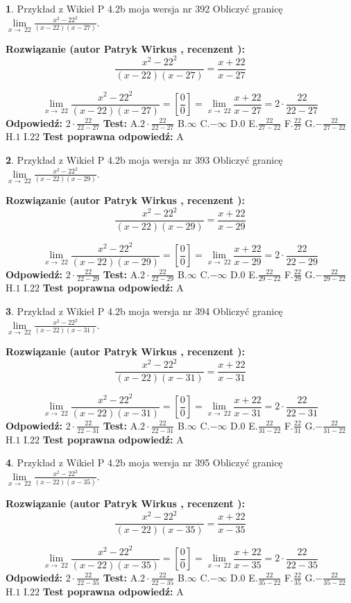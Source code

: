\documentclass[12pt, a4paper]{article}
\theoremstyle{definition} %
\newtheorem{zad}{}
\newcommand{\zadStart}[1]{\begin{zad}#1\newline}
\newcommand{\zadStop}{\end{zad}}
\newcommand{\rozwStart}[2]{\noindent \textbf{Rozwiązanie (autor #1 , recenzent #2): }\newline}
\newcommand{\rozwStop}{\newline}
\newcommand{\odpStart}{\noindent \textbf{Odpowiedź:}\newline}
\newcommand{\odpStop}{\newline}
\newcommand{\testStart}{\noindent \textbf{Test:}\newline}
\newcommand{\testStop}{\newline}
\newcommand{\kluczStart}{\noindent \textbf{Test poprawna odpowiedź:}\newline}
\newcommand{\kluczStop}{\newline}
\begin{document}
\zadStart{Przykład z Wikieł P 4.2b moja wersja nr 392}
Obliczyć granicę $\lim\limits_{x\to\ 22}\frac{x^{2}-22^{2}}{(x-22)(x-27)}$.
\zadStop
\rozwStart{Patryk Wirkus}{}
$$\frac{x^{2}-22^{2}}{(x-22)(x-27)}=\frac{x+22}{x-27}$$

$$\lim\limits_{x\to\ 22}\frac{x^{2}-22^{2}}{(x-22)(x-27)}=[\frac{0}{0}]=\lim\limits_{x\to\ 22}\frac{x+22}{x-27}=2 \cdot \frac{22}{22-27}$$
\rozwStop
\odpStart
$2 \cdot \frac{22}{22-27}$
\odpStop
\testStart
A.$2 \cdot \frac{22}{22-27}$
B.$\infty$
C.$-\infty$
D.$0$
E.$\frac{22}{27-22}$
F.$\frac{22}{27}$
G.$-\frac{22}{27-22}$
H.$1$
I.$22$
\testStop
\kluczStart
A
\kluczStop



\zadStart{Przykład z Wikieł P 4.2b moja wersja nr 393}
Obliczyć granicę $\lim\limits_{x\to\ 22}\frac{x^{2}-22^{2}}{(x-22)(x-29)}$.
\zadStop
\rozwStart{Patryk Wirkus}{}
$$\frac{x^{2}-22^{2}}{(x-22)(x-29)}=\frac{x+22}{x-29}$$

$$\lim\limits_{x\to\ 22}\frac{x^{2}-22^{2}}{(x-22)(x-29)}=[\frac{0}{0}]=\lim\limits_{x\to\ 22}\frac{x+22}{x-29}=2 \cdot \frac{22}{22-29}$$
\rozwStop
\odpStart
$2 \cdot \frac{22}{22-29}$
\odpStop
\testStart
A.$2 \cdot \frac{22}{22-29}$
B.$\infty$
C.$-\infty$
D.$0$
E.$\frac{22}{29-22}$
F.$\frac{22}{29}$
G.$-\frac{22}{29-22}$
H.$1$
I.$22$
\testStop
\kluczStart
A
\kluczStop



\zadStart{Przykład z Wikieł P 4.2b moja wersja nr 394}
Obliczyć granicę $\lim\limits_{x\to\ 22}\frac{x^{2}-22^{2}}{(x-22)(x-31)}$.
\zadStop
\rozwStart{Patryk Wirkus}{}
$$\frac{x^{2}-22^{2}}{(x-22)(x-31)}=\frac{x+22}{x-31}$$

$$\lim\limits_{x\to\ 22}\frac{x^{2}-22^{2}}{(x-22)(x-31)}=[\frac{0}{0}]=\lim\limits_{x\to\ 22}\frac{x+22}{x-31}=2 \cdot \frac{22}{22-31}$$
\rozwStop
\odpStart
$2 \cdot \frac{22}{22-31}$
\odpStop
\testStart
A.$2 \cdot \frac{22}{22-31}$
B.$\infty$
C.$-\infty$
D.$0$
E.$\frac{22}{31-22}$
F.$\frac{22}{31}$
G.$-\frac{22}{31-22}$
H.$1$
I.$22$
\testStop
\kluczStart
A
\kluczStop



\zadStart{Przykład z Wikieł P 4.2b moja wersja nr 395}
Obliczyć granicę $\lim\limits_{x\to\ 22}\frac{x^{2}-22^{2}}{(x-22)(x-35)}$.
\zadStop
\rozwStart{Patryk Wirkus}{}
$$\frac{x^{2}-22^{2}}{(x-22)(x-35)}=\frac{x+22}{x-35}$$

$$\lim\limits_{x\to\ 22}\frac{x^{2}-22^{2}}{(x-22)(x-35)}=[\frac{0}{0}]=\lim\limits_{x\to\ 22}\frac{x+22}{x-35}=2 \cdot \frac{22}{22-35}$$
\rozwStop
\odpStart
$2 \cdot \frac{22}{22-35}$
\odpStop
\testStart
A.$2 \cdot \frac{22}{22-35}$
B.$\infty$
C.$-\infty$
D.$0$
E.$\frac{22}{35-22}$
F.$\frac{22}{35}$
G.$-\frac{22}{35-22}$
H.$1$
I.$22$
\testStop
\kluczStart
A
\kluczStop
\end{document}
